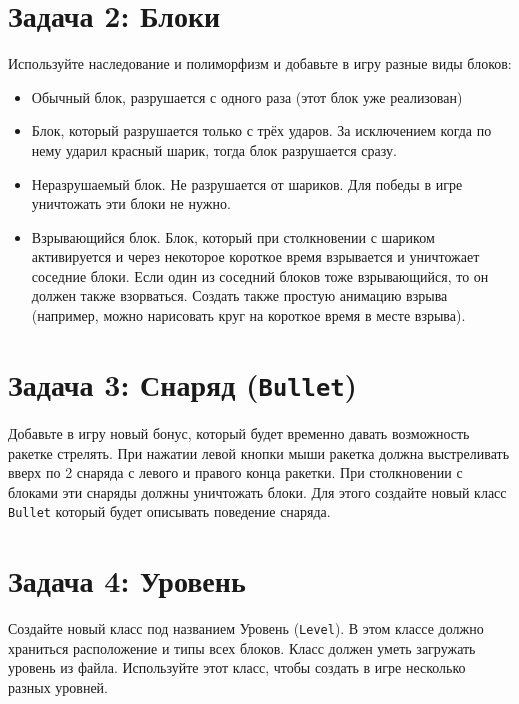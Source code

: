\documentclass{article}
\begin{document}
\section*{Задача 2: Блоки}
Используйте наследование и полиморфизм и добавьте в игру разные виды блоков:
\begin{itemize}
\item Обычный блок, разрушается с одного раза (этот блок уже реализован)
\item Блок, который разрушается только с трёх ударов. За исключением когда по нему ударил красный шарик, тогда блок разрушается сразу.
\item Неразрушаемый блок. Не разрушается от шариков. Для победы в игре уничтожать эти блоки не нужно.
\item Взрывающийся блок. Блок, который при столкновении с шариком активируется и через некоторое короткое время взрывается и уничтожает соседние блоки. Если один из соседний блоков тоже взрывающийся, то он должен также взорваться. Создать также простую анимацию взрыва (например, можно нарисовать круг на короткое время в месте взрыва).
\end{itemize}

\section*{Задача 3: Снаряд (\texttt{Bullet})}
Добавьте в игру новый бонус, который будет временно давать возможность ракетке стрелять. При нажатии левой кнопки мыши ракетка должна выстреливать вверх по 2 снаряда с левого и правого конца ракетки. При столкновении с блоками эти снаряды должны уничтожать блоки. Для этого создайте новый класс \texttt{Bullet} который будет описывать поведение снаряда.

\section*{Задача 4: Уровень}
Создайте новый класс под названием Уровень (\texttt{Level}). В этом классе должно храниться расположение и типы всех блоков. Класс должен уметь загружать уровень из файла. Используйте этот класс, чтобы создать в игре несколько разных уровней.
\end{document}
